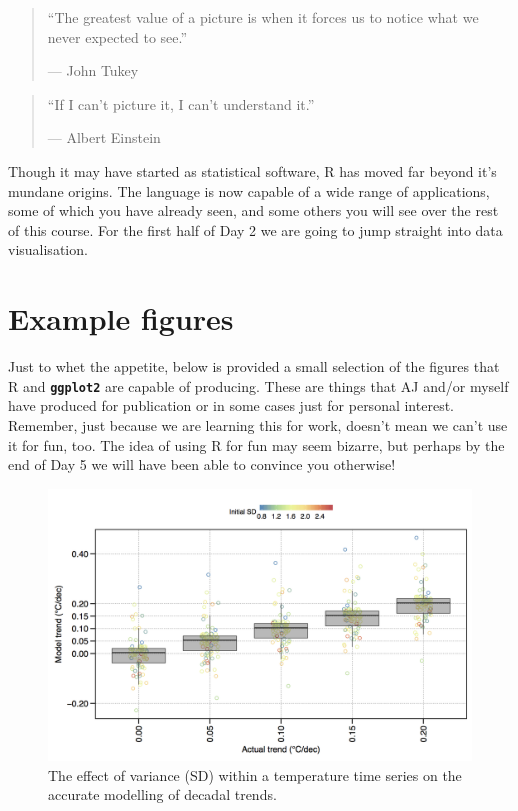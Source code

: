 \documentclass[]{book}
\theoremstyle{definition}
\theoremstyle{definition}
\theoremstyle{definition}
\theoremstyle{remark}
\begin{document}
\begin{quote}
``The greatest value of a picture is when it forces us to notice what we
never expected to see.''

--- John Tukey
\end{quote}

\begin{quote}
``If I can't picture it, I can't understand it.''

--- Albert Einstein
\end{quote}

Though it may have started as statistical software, R has moved far
beyond it's mundane origins. The language is now capable of a wide range
of applications, some of which you have already seen, and some others
you will see over the rest of this course. For the first half of Day 2
we are going to jump straight into data visualisation.

\section{Example figures}\label{example-figures}

Just to whet the appetite, below is provided a small selection of the
figures that R and \textbf{\texttt{ggplot2}} are capable of producing.
These are things that AJ and/or myself have produced for publication or
in some cases just for personal interest. Remember, just because we are
learning this for work, doesn't mean we can't use it for fun, too. The
idea of using R for fun may seem bizarre, but perhaps by the end of Day
5 we will have been able to convince you otherwise!

\begin{figure}

{\centering \includegraphics[width=1\linewidth]{figures/all_plt0_no_interp_natural} 

}

\caption{The effect of variance (SD) within a temperature time series on the accurate modelling of decadal trends.}\label{fig:example1}
\end{figure}
\end{document}
